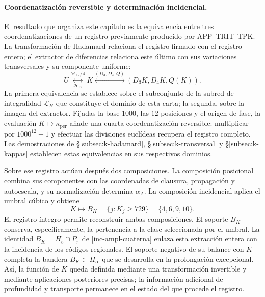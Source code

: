 \paragraph{Coordenatización reversible y determinación incidencial.}
\label{ampl-alfa-k-intro-reversible}
El resultado que organiza este capítulo es la equivalencia entre tres
coordenatizaciones de un registro previamente producido por
APP--TRIT--TPK. La transformación de Hadamard relaciona el registro
firmado con el registro entero; el extractor de diferencias relaciona
este último con sus variaciones transversales y su componente uniforme:
\[
 U\underset{\mathcal H_{12}}{\overset{\mathcal H_{12}/4}{\longleftrightarrow}}K
 \overset{(D_3,D_4,Q)}{\longleftrightarrow}
 (D_3K,D_4K,Q(K)).
\]
La primera equivalencia se establece sobre el subconjunto de la subred de
integralidad $\mathcal L_H$ que constituye el dominio de esta carta; la
segunda, sobre la imagen del extractor. Fijadas la
base $1000$, las $12$ posiciones y el origen de fase, la evaluación
$K\mapsto\kappa_{\mathrm{per}}$ añade una cuarta coordenatización
reversible: multiplicar por $1000^{12}-1$ y efectuar las divisiones
euclídeas recupera el registro completo. Las demostraciones de
\S\ref{subsec:k-hadamard}, \S\ref{subsec:k-transversal} y
\S\ref{subsec:k-kappas} establecen estas equivalencias en sus respectivos
dominios.

Sobre ese registro actúan después dos composiciones. La composición
posicional combina sus componentes con las coordenadas de clausura,
propagación y autoescala, y su normalización determina $\alpha_A$. La
composición incidencial aplica el umbral cúbico y obtiene
\[
 K\longmapsto B_K=\{j:K_j\geq729\}=\{4,6,9,10\}.
\]
El registro íntegro permite reconstruir ambas composiciones. El soporte
$B_K$ conserva, específicamente, la pertenencia a la clase seleccionada
por el umbral. La identidad $B_K=H_e\cap P_\pi$ de
\eqref{inc-ampl-cuaterna} enlaza esta extracción entera con la incidencia
de los códigos regionales. El soporte negativo de su balance con $K$
completa la bandera $B_K\subset H^-_\alpha$ que se desarrolla en la
prolongación excepcional. Así, la función de $K$ queda definida mediante
una transformación invertible y mediante aplicaciones posteriores
precisas; la información adicional de profundidad y transporte permanece
en el estado del que procede el registro.
